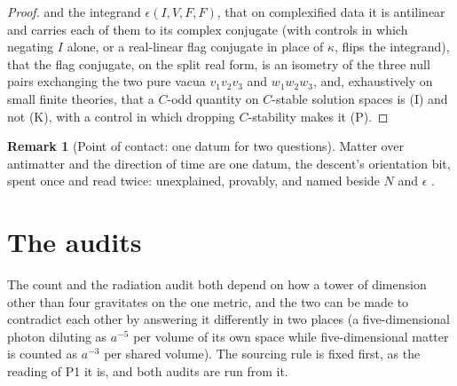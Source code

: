 \documentclass[11pt]{article}
\theoremstyle{definition}
\newtheorem{remark}[theorem]{Remark}
\theoremstyle{plain}
\begin{document}
\begin{proof}
and the integrand $\epsilon(I, V, F, F)$, that on complexified data it is antilinear and carries each of them to its complex conjugate (with controls in which negating $I$ alone, or a real-linear flag conjugate in place of $\kappa$, flips the integrand), that the flag conjugate, on the split real form, is an isometry of the three null pairs exchanging the two pure vacua $v_{1}v_{2}v_{3}$ and $w_{1}w_{2}w_{3}$, and, exhaustively on small finite theories, that a $C$-odd quantity on $C$-stable solution spaces is (I) and not (K), with a control in which dropping $C$-stability makes it (P).

\end{proof}

\begin{remark}[Point of contact: one datum for two questions]\label{c:note.dark-matter.point-contact-one-datum-two-questions}
Matter over antimatter and the direction of time are one datum, the descent's orientation bit, spent once and read twice: unexplained, provably, and named beside $N$ and $\epsilon$ \cite{ButlerT17}.
\end{remark}

\section{The audits}

\label{c:note.dark-matter.setting-audits}
The count and the radiation audit both depend on how a tower of dimension other than four gravitates on the one metric, and the two can be made to contradict each other by answering it differently in two places (a five-dimensional photon diluting as $a^{-5}$ per volume of its own space while five-dimensional matter is counted as $a^{-3}$ per shared volume). The sourcing rule is fixed first, as the reading of P1 it is, and both audits are run from it.
\end{document}

